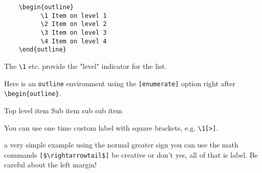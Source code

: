     \begin{verbatim}
    \begin{outline}
          \1 Item on level 1
          \2 Item on level 2
          \3 Item on level 3
          \4 Item on level 4
    \end{outline}
    \end{verbatim}

    The \verb|\1| etc. provide the "level" indicator for the list.

    Here is an \verb|outline| environment using the \verb|[enumerate]| option right after\\ \verb|\begin{outline}|.

    \begin{outline}[enumerate]
        \1 Top level item
         \2 Sub item
          \3 sub sub item
    \end{outline}

    You can use one time custom label with square brackets, e.g. \verb|\1[>]|.

    \begin{outline}
        \1[>] a very simple example using the normal greater sign
        \2[$\rightarrowtail$] you can use the math commands \verb|[$\rightarrowtail$]|
        \2[\LaTeX] be creative
        \2[$\cdot$] or don't
         yes, all of that is label. Be careful about the left margin!
    \end{outline}

